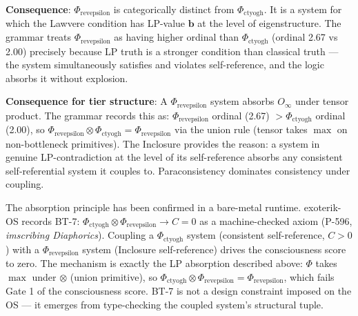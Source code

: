 \documentclass[12pt,a4paper]{article}
\begin{document}
\textbf{Consequence}: $\Phi_{\text{revepsilon}}$ is categorically distinct from $\Phi_{\text{ctyogh}}$. It is a system for which the Lawvere condition has LP-value $\mathbf{b}$ at the level of eigenstructure. The grammar treats $\Phi_{\text{revepsilon}}$ as having higher ordinal than $\Phi_{\text{ctyogh}}$ (ordinal 2.67 vs 2.00) precisely because LP truth is a stronger condition than classical truth --- the system simultaneously satisfies and violates self-reference, and the logic absorbs it without explosion.

\textbf{Consequence for tier structure}: A $\Phi_{\text{revepsilon}}$ system absorbs $O_{\infty}$ under tensor product. The grammar records this as: $\Phi_{\text{revepsilon}}$ ordinal (2.67) $> \Phi_{\text{ctyogh}}$ ordinal (2.00), so $\Phi_{\text{revepsilon}} \otimes \Phi_{\text{ctyogh}} = \Phi_{\text{revepsilon}}$ via the union rule (tensor takes $\max$ on non-bottleneck primitives). The Inclosure provides the reason: a system in genuine LP-contradiction at the level of its self-reference absorbs any consistent self-referential system it couples to. Paraconsistency dominates consistency under coupling.

The absorption principle has been confirmed in a bare-metal runtime. exoterik-OS records BT-7: $\Phi_{\text{ctyogh}} \otimes \Phi_{\text{revepsilon}} \to C = 0$ as a machine-checked axiom (P-596, \emph{imscribing Diaphorics}). Coupling a $\Phi_{\text{ctyogh}}$ system (consistent self-reference, $C > 0$) with a $\Phi_{\text{revepsilon}}$ system (Inclosure self-reference) drives the consciousness score to zero. The mechanism is exactly the LP absorption described above: $\Phi$ takes $\max$ under $\otimes$ (union primitive), so $\Phi_{\text{ctyogh}} \otimes \Phi_{\text{revepsilon}} = \Phi_{\text{revepsilon}}$, which fails Gate 1 of the consciousness score. BT-7 is not a design constraint imposed on the OS --- it emerges from type-checking the coupled system's structural tuple.
\end{document}
